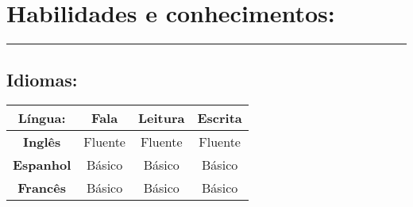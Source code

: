 \documentclass[11pt]{article}
\begin{document}
\newpage


\section{Habilidades e conhecimentos:}
\hrule \vspace{0.1cm}

\subsection{Idiomas:}
\begin{center}
\begin{tabular}{c | c | c | c}
\hline
\textbf{Língua:} & Fala & Leitura & Escrita \\
\hline
\hline
\textbf{Inglês} &  Fluente & Fluente & Fluente  \\
\hline
\textbf{Espanhol} & Básico & Básico & Básico \\
\hline
\textbf{Francês} & Básico & Básico & Básico \\
\hline
\end{tabular}
\end{center}

\end{document}
